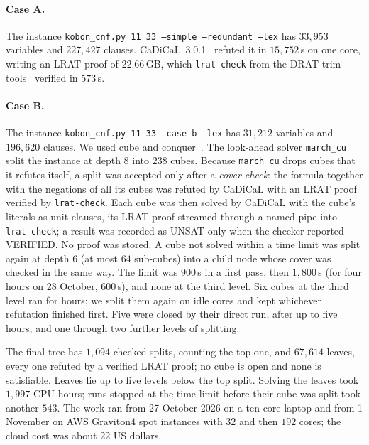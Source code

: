 \documentclass[11pt]{article}
\theoremstyle{definition}
\theoremstyle{remark}
\begin{document}
\paragraph{Case A.} The instance \texttt{kobon\_cnf.py 11 33 --simple --redundant --lex} has
$33{,}953$ variables and $227{,}427$ clauses. CaDiCaL~3.0.1~\cite{cadical} refuted it in
$15{,}752$\,s on one core, writing an LRAT proof of $22.66$\,GB, which \texttt{lrat-check} from
the DRAT-trim tools~\cite{drattrim,lrat} verified in $573$\,s.

\paragraph{Case B.} The instance \texttt{kobon\_cnf.py 11 33 --case-b --lex} has $31{,}212$
variables and $196{,}620$ clauses. We used cube and conquer~\cite{cnc}. The look-ahead solver
\texttt{march\_cu} split the instance at depth $8$ into $238$ cubes. Because \texttt{march\_cu}
drops cubes that it refutes itself, a split was accepted only after a \emph{cover check}: the
formula together with the negations of all its cubes was refuted by CaDiCaL with an LRAT proof
verified by \texttt{lrat-check}. Each cube was then solved by CaDiCaL with the cube's literals as
unit clauses, its LRAT proof streamed through a named pipe into \texttt{lrat-check}; a result was
recorded as UNSAT only when the checker reported VERIFIED. No proof was stored. A cube not solved
within a time limit was split again at depth $6$ (at most $64$ sub-cubes) into a child node whose
cover was checked in the same way. The limit was $900$\,s in a first pass, then $1{,}800$\,s
(for four hours on 28 October, $600$\,s), and none at the third level. Six cubes at the third level
ran for hours; we split them again on idle cores and kept whichever refutation finished first. Five
were closed by their direct run, after up to five hours, and one through two further levels of
splitting.

The final tree has $1{,}094$ checked splits, counting the top one, and $67{,}614$ leaves, every one
refuted by a verified LRAT proof; no cube is open and none is satisfiable. Leaves lie up to five
levels below the top split. Solving the leaves took $1{,}997$ CPU hours; runs stopped at the time
limit before their cube was split took another $543$. The work ran from 27 October 2026 on a
ten-core laptop and from 1 November on AWS Graviton4 spot instances with $32$ and then $192$ cores;
the cloud cost was about $22$ US dollars.
\end{document}
